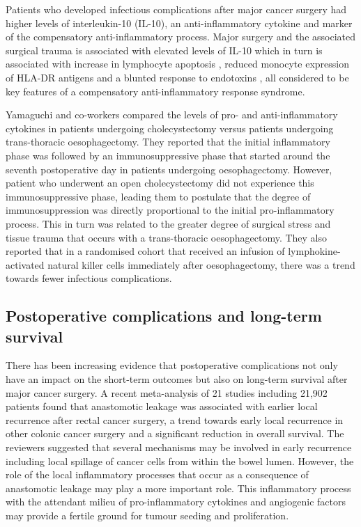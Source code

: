 Patients who developed infectious complications after major cancer surgery had higher levels of interleukin-10 (IL-10), an anti-inflammatory cytokine and marker of the compensatory anti-inflammatory process.\parencite{mokart_early_2002} Major surgery and the associated surgical trauma is associated with elevated levels of IL-10 which in turn is associated with increase in lymphocyte apoptosis \parencite{delogu_interleukin-10_2001}, reduced monocyte expression of HLA-DR antigens \parencite{klava_interleukin-10._1997} and a blunted response to endotoxins \parencite{ogata_role_2000, kawasaki_surgical_2001}, all considered to be key features of a compensatory anti-inflammatory response syndrome. 

Yamaguchi and co-workers compared the levels of pro- and anti-inflammatory cytokines in patients undergoing cholecystectomy versus patients undergoing trans-thoracic oesophagectomy. They reported that the initial inflammatory phase was followed by an immunosuppressive phase that started around the seventh postoperative day in patients undergoing oesophagectomy. However, patient who underwent an open cholecystectomy did not experience this immunosuppressive phase, leading them to postulate that the degree of immunosuppression was directly proportional to the initial pro-inflammatory process. This in turn was related to the greater degree of surgical stress and tissue trauma that occurs with a trans-thoracic oesophagectomy. They also reported that in a randomised cohort that received an infusion of lymphokine-activated natural killer cells immediately after oesophagectomy, there was a trend towards fewer infectious complications.\parencite{yamaguchi_postoperative_2006}

\subsection{Postoperative complications and long-term survival}
There has been increasing evidence that postoperative complications not only have an impact on the short-term outcomes but also on long-term survival after major cancer surgery. A recent meta-analysis of 21 studies including 21,902 patients found that anastomotic leakage was associated with earlier local recurrence after rectal cancer surgery, a trend towards early local recurrence in other colonic cancer surgery and a significant reduction in overall survival.\parencite{mirnezami_increased_2011} The reviewers suggested that several mechanisms may be involved in early recurrence including local spillage of cancer cells from within the bowel lumen. However, the role of the local inflammatory processes that occur as a consequence of anastomotic leakage may play a more important role. This inflammatory process with the attendant milieu of pro-inflammatory cytokines and angiogenic factors may provide a fertile ground for tumour seeding and proliferation.

